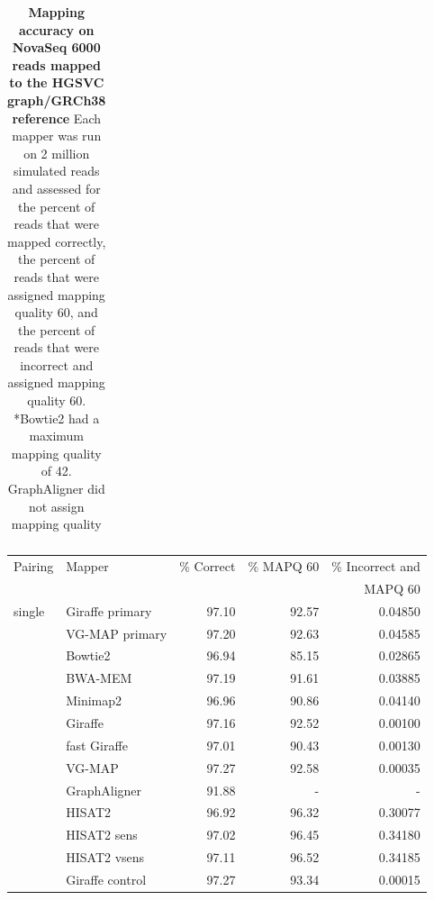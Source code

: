 \documentclass[11pt]{ucscthesis}
\begin{document}
\begin{table}[p]
\begin{tabular}{|l|l|r|r|r|}
        \hline
        
    \end{tabular}
    \caption[Mapping accuracy on NovaSeq 6000 reads mapped to the HGSVC graph/GRCh38 reference]{\textbf{Mapping accuracy on NovaSeq 6000 reads mapped to the HGSVC graph/GRCh38 reference} Each mapper was run on 2 million simulated reads and assessed for the percent of reads that were mapped correctly, the percent of reads that were assigned mapping quality 60, and the percent of reads that were incorrect and assigned mapping quality 60. *Bowtie2 had a maximum mapping quality of 42. GraphAligner did not assign mapping quality}
    \label{tab:mapping_accuracy_hgsvc_novaseq6000}
\end{table}

\begin{table}[p]
    \centering
    \begin{tabular}{|l|l|r|r|r|}
    \hline
        Pairing & Mapper & \% Correct & \% MAPQ 60 & \% Incorrect and \\
               &         &            &            & MAPQ 60          \\
        \hline
        single  & Giraffe primary	& 97.10     & 92.57     & 0.04850 \\
                & VG-MAP primary   	& 97.20     & 92.63     & 0.04585 \\
                & Bowtie2       	& 96.94     & 85.15     & 0.02865 \\
                & BWA-MEM       	& 97.19     & 91.61     & 0.03885 \\
                & Minimap2	        & 96.96     & 90.86     & 0.04140 \\
                & Giraffe	        & 97.16     & 92.52     & 0.00100 \\
                & fast Giraffe  	& 97.01     & 90.43     & 0.00130 \\
                & VG-MAP	        & 97.27     & 92.58     & 0.00035 \\
                & GraphAligner   	& 91.88     & -         & - \\
                & HISAT2	        & 96.92     & 96.32     & 0.30077 \\
                & HISAT2 sens   	& 97.02     & 96.45     & 0.34180 \\
                & HISAT2 vsens	    & 97.11     & 96.52     & 0.34185 \\
                & Giraffe control	& 97.27     & 93.34     & 0.00015 \\


\end{tabular}
\end{table}
\end{document}

